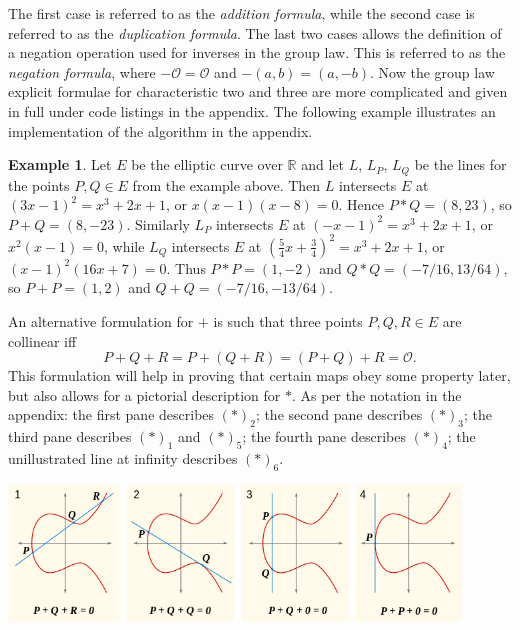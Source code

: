 \documentclass{article}
\newcommand{\R}{\mathbb{R}}
\newcommand{\rb}[1]{\left( #1 \right)}
\theoremstyle{definition}\newtheorem*{definition}{Definition}
\theoremstyle{definition}\newtheorem*{example}{Example}
\theoremstyle{definition}\newtheorem*{remark}{Remark}
\begin{document}
The first case is referred to as the \emph{addition formula}, while the second case is referred to as the \emph{duplication formula}. The last two cases allows the definition of a negation operation used for inverses in the group law. This is referred to as the \emph{negation formula}, where $ -\mathcal{O} = \mathcal{O} $ and $ -\rb{a, b} = \rb{a, -b} $. Now the group law explicit formulae for characteristic two and three are more complicated and given in full under code listings in the appendix. The following example illustrates an implementation of the algorithm in the appendix.

\begin{example}
Let $ E $ be the elliptic curve over $ \R $ and let $ L $, $ L_P $, $ L_Q $ be the lines for the points $ P, Q \in E $ from the example above. Then $ L $ intersects $ E $ at $ \rb{3x - 1}^2 = x^3 + 2x + 1 $, or $ x\rb{x - 1}\rb{x - 8} = 0 $. Hence $ P * Q = \rb{8, 23} $, so $ P + Q = \rb{8, -23} $. Similarly $ L_P $ intersects $ E $ at $ \rb{-x - 1}^2 = x^3 + 2x + 1 $, or $ x^2\rb{x - 1} = 0 $, while $ L_Q $ intersects $ E $ at $ \rb{\tfrac{5}{4}x + \tfrac{3}{4}}^2 = x^3 + 2x + 1 $, or $ \rb{x - 1}^2\rb{16x + 7} = 0 $. Thus $ P * P = \rb{1, -2} $ and $ Q * Q = \rb{-7 / 16, 13 / 64} $, so $ P + P = \rb{1, 2} $ and $ Q + Q = \rb{-7 / 16, -13 / 64} $.
\end{example}

An alternative formulation for $ + $ is such that three points $ P, Q, R \in E $ are collinear iff
$$ P + Q + R = P + \rb{Q + R} = \rb{P + Q} + R = \mathcal{O}. $$
This formulation will help in proving that certain maps obey some property later, but also allows for a pictorial description for $ * $. As per the notation in the appendix: the first pane describes $ \rb{*}_2 $; the second pane describes $ \rb{*}_3 $; the third pane describes $ \rb{*}_1 $ and $ \rb{*}_5 $; the fourth pane describes $ \rb{*}_4 $; the unillustrated line at infinity describes $ \rb{*}_6 $.
\begin{center}
\includegraphics*[width=0.9\textwidth]{img/ECClines.png}
\end{center}
\end{document}
